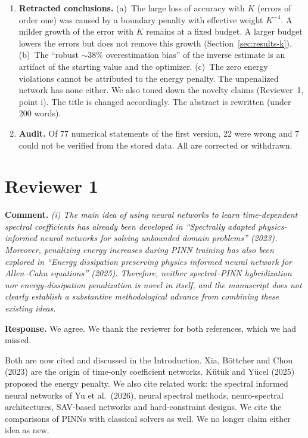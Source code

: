 \documentclass[11pt]{article}
\newcommand{\rc}[1]{\par\medskip\noindent\textbf{Comment.} \emph{#1}\par\smallskip\noindent\textbf{Response.} }
\begin{document}
\begin{enumerate}[leftmargin=*,itemsep=2pt]
\item \textbf{Retracted conclusions.}
(a)~The large loss of accuracy with $K$ (errors of order one) was caused by a boundary penalty with effective weight $K^{-4}$. A milder growth of the error with $K$ remains at a fixed budget. A larger budget lowers the errors but does not remove this growth (Section~\ref{sec:results-k}).
(b)~The ``robust $\sim38\%$ overestimation bias'' of the inverse estimate is an artifact of the starting value and the optimizer.
(c)~The zero energy violations cannot be attributed to the energy penalty. The unpenalized network has none either.
We also toned down the novelty claims (Reviewer~1, point i). The title is changed accordingly. The abstract is rewritten (under 200 words).
\item \textbf{Audit.} Of 77 numerical statements of the first version, 22 were wrong and 7 could not be verified from the stored data. All are corrected or withdrawn.
\end{enumerate}

\section*{Reviewer 1}

\rc{(i) The main idea of using neural networks to learn time-dependent spectral coefficients has already been developed in ``Spectrally adapted physics-informed neural networks for solving unbounded domain problems'' (2023). Moreover, penalizing energy increases during PINN training has also been explored in ``Energy dissipation preserving physics informed neural network for Allen--Cahn equations'' (2025). Therefore, neither spectral--PINN hybridization nor energy-dissipation penalization is novel in itself, and the manuscript does not clearly establish a substantive methodological advance from combining these existing ideas.}
We agree. We thank the reviewer for both references, which we had missed.

Both are now cited and discussed in the Introduction. Xia, B\"ottcher and Chou (2023) are the origin of time-only coefficient networks. K\"ut\"uk and Y\"ucel (2025) proposed the energy penalty. We also cite related work: the spectral informed neural networks of Yu et al.\ (2026), neural spectral methods, neuro-spectral architectures, SAV-based networks and hard-constraint designs. We cite the comparisons of PINNs with classical solvers as well. We no longer claim either idea as new.
\end{document}
